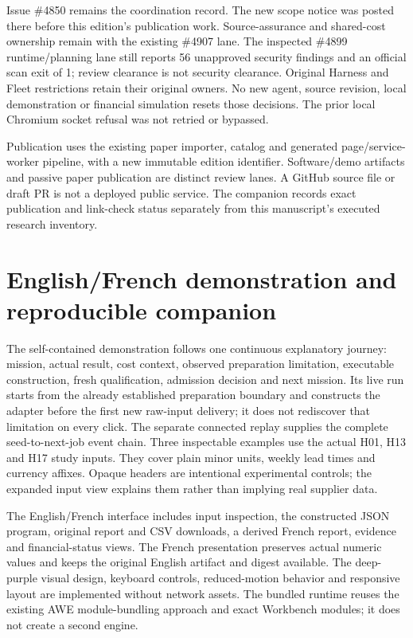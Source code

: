 \documentclass[11pt,letterpaper]{article}
\begin{document}
Issue \#4850 remains the coordination record. The new scope notice was posted there before this edition's publication work. Source-assurance and shared-cost ownership remain with the existing \#4907 lane. The inspected \#4899 runtime/planning lane still reports 56 unapproved security findings and an official scan exit of 1; review clearance is not security clearance. Original Harness and Fleet restrictions retain their original owners. No new agent, source revision, local demonstration or financial simulation resets those decisions. The prior local Chromium socket refusal was not retried or bypassed.

Publication uses the existing paper importer, catalog and generated page/service-worker pipeline, with a new immutable edition identifier. Software/demo artifacts and passive paper publication are distinct review lanes. A GitHub source file or draft PR is not a deployed public service. The companion records exact publication and link-check status separately from this manuscript's executed research inventory.

\section{English/French demonstration and reproducible companion}
\label{sec:repro}

The self-contained demonstration follows one continuous explanatory journey: mission, actual result, cost context, observed preparation limitation, executable construction, fresh qualification, admission decision and next mission. Its live run starts from the already established preparation boundary and constructs the adapter before the first new raw-input delivery; it does not rediscover that limitation on every click. The separate connected replay supplies the complete seed-to-next-job event chain. Three inspectable examples use the actual H01, H13 and H17 study inputs. They cover plain minor units, weekly lead times and currency affixes. Opaque headers are intentional experimental controls; the expanded input view explains them rather than implying real supplier data.

The English/French interface includes input inspection, the constructed JSON program, original report and CSV downloads, a derived French report, evidence and financial-status views. The French presentation preserves actual numeric values and keeps the original English artifact and digest available. The deep-purple visual design, keyboard controls, reduced-motion behavior and responsive layout are implemented without network assets. The bundled runtime reuses the existing AWE module-bundling approach and exact Workbench modules; it does not create a second engine.
\end{document}
